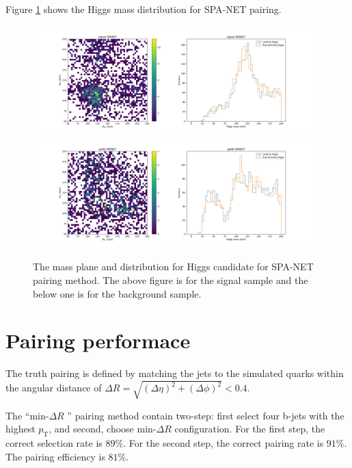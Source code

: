 \documentclass[12pt]{article}
\begin{document}
		Figure \ref{fig:Higgs_mass_new_SPANET_wrong} shows the Higgs mass distribution for SPA-NET pairing.
		\begin{figure}[htpb]
			\centering
			\includegraphics[width=0.97\textwidth]{Higgs_mass_new_SPANET_wrong_s.png}
			\includegraphics[width=0.97\textwidth]{Higgs_mass_new_SPANET_wrong_4b.png}
			\caption{The mass plane and distribution for Higgs candidate for SPA-NET pairing method. The above figure is for the signal sample and the below one is for the background sample.}
			\label{fig:Higgs_mass_new_SPANET_wrong}
		\end{figure}


\section{Pairing performace}%
\label{sec:pairing_performace}

	The truth pairing is defined by matching the jets to the simulated quarks within the angular distance of $\Delta R = \sqrt{(\Delta\eta)^2 + (\Delta\phi)^2} < 0.4$.
	
	The ``$\text{min-}\Delta R$ '' pairing method contain two-step: first select four b-jets with the highest $p_\text{T}$, and second, choose $\text{min-}\Delta R$ configuration. For the first step, the correct selection rate is $89\%$. For the second step, the correct pairing rate is  $91 \%$. The pairing efficiency is  $81 \%$.
\end{document}
